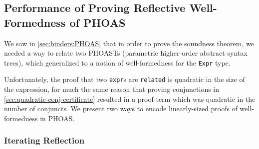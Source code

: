 \subsection{Performance of Proving Reflective Well-Formedness of PHOAS} \label{sec:wf:perf}

We saw in \autoref{sec:binders:PHOAS} that in order to prove the soundness theorem, we needed a way to relate two PHOASTs (parametric higher-order abstract syntax trees), which generalized to a notion of well-formedness for the \texttt{Expr} type.

Unfortunately, the proof that two \texttt{expr}s are \texttt{related} is quadratic in the size of the expression, for much the same reason that proving conjunctions in \autoref{sec:quadratic-conj-certificate} resulted in a proof term which was quadratic in the number of conjuncts.
We present two ways to encode linearly-sized proofs of well-formedness in PHOAS.

\subsubsection{Iterating Reflection} \label{sec:wf:perf:reflective}

